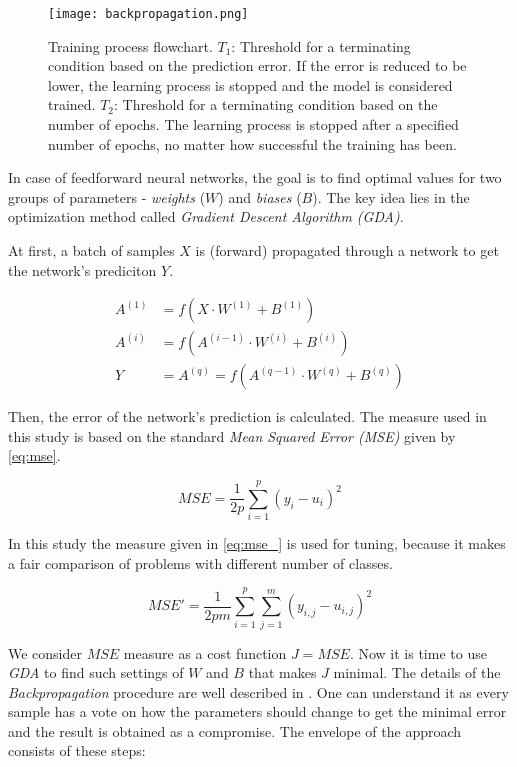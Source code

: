 \begin{figure}[H]
  \centering
  \texttt{[image: backpropagation.png]}
  \caption{Training process flowchart. $ T_1 $: Threshold for a terminating condition based on the prediction error. If the error is reduced to be lower, the learning process is stopped and the model is considered trained. $ T_2 $: Threshold for a terminating condition based on the number of epochs. The learning process is stopped after a specified number of epochs, no matter how successful the training has been.}
  \label{fig:methods:backpropagation}
\end{figure}

In case of feedforward neural networks, the goal is to find optimal values for two groups of parameters - \textit{weights} ($ W $) and \textit{biases} ($ B $). The key idea lies in the optimization method called \textit{Gradient Descent Algorithm (GDA)}.

At first, a batch of samples $ X $ is (forward) propagated through a network to get the network's prediciton $ Y $.

\begin{align}
A^{(1)} &= f(X \cdot W^{(1)} + B^{(1)}) \\
A^{(i)} &= f(A^{(i-1)} \cdot W^{(i)} + B^{(i)}) \\
Y &= A^{(q)} = f(A^{(q-1)} \cdot W^{(q)} + B^{(q)})
\end{align}

Then, the error of the network's prediction is calculated. The measure used in this study is based on the standard \textit{Mean Squared Error (MSE)} given by \cref{eq:mse}.

\begin{equation} \label{eq:mse}
MSE = \frac{1}{2 p} \displaystyle{\sum^{p}_{i=1} (y_i - u_i)^2}
\end{equation}

In this study the measure given in \cref{eq:mse_} is used for tuning, because it makes a fair comparison of problems with different number of classes.

\begin{equation} \label{eq:mse_}
MSE' = \frac{1}{2 p m} \displaystyle \sum^{p}_{i=1} \displaystyle \sum^{m}_{j=1} (y_{i,j} - u_{i,j})^2
\end{equation}

We consider $ MSE $ measure as a cost function $ J = MSE $. Now it is time to use \textit{GDA} to find such settings of $ W $ and $ B $ that makes $ J $ minimal. The details of the \textit{Backpropagation} procedure are well described in \citep{online:nnanddl}. One can understand it as every sample has a vote on how the parameters should change to get the minimal error and the result is obtained as a compromise. The envelope of the approach consists of these steps:

